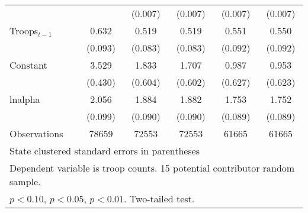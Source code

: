 \begin{table}[htbp]
\begin{tabular}{l*{5}{c}}
                    &                    &     (0.007)        &     (0.007)        &     (0.007)        &     (0.007)        \\
[0.5em]
Troops$_{t-1}$              &       0.632\sym{**}&       0.519\sym{**}&       0.519\sym{**}&       0.551\sym{**}&       0.550\sym{**}\\
                    &     (0.093)        &     (0.083)        &     (0.083)        &     (0.092)        &     (0.092)        \\
[0.5em]
Constant            &       3.529\sym{**}&       1.833\sym{**}&       1.707\sym{**}&       0.987        &       0.953        \\
                    &     (0.430)        &     (0.604)        &     (0.602)        &     (0.627)        &     (0.623)        \\
\hline
lnalpha             &       2.056\sym{**}&       1.884\sym{**}&       1.882\sym{**}&       1.753\sym{**}&       1.752\sym{**}\\
                    &     (0.099)        &     (0.090)        &     (0.090)        &     (0.089)        &     (0.089)        \\
\hline
Observations        &       78659        &       72553        &       72553        &       61665        &       61665        \\
\hline\hline
\multicolumn{6}{l}{\footnotesize State clustered standard errors in parentheses}\\
\multicolumn{6}{l}{\footnotesize Dependent variable is troop counts. 15 potential contributor random sample.}\\
\multicolumn{6}{l}{\footnotesize \sym{\dagger} \(p<0.10\), \sym{*} \(p<0.05\), \sym{**} \(p<0.01\). Two-tailed test.}\\
\end{tabular}
\end{table}
